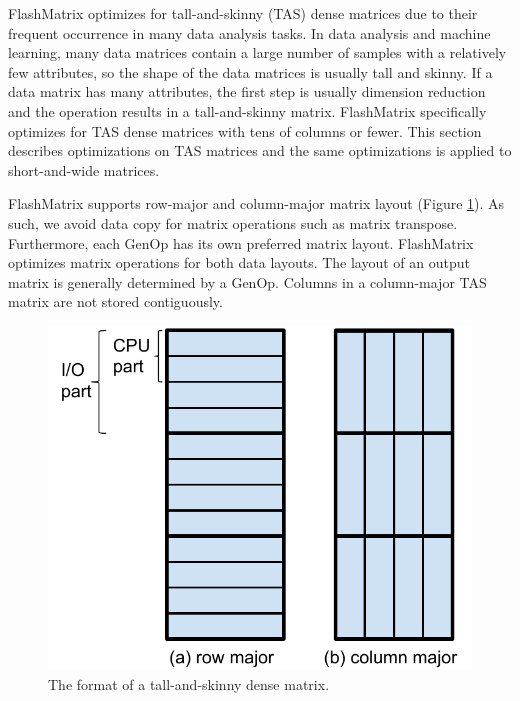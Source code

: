 FlashMatrix optimizes for tall-and-skinny (TAS) dense matrices due to their
frequent occurrence in many data analysis tasks.
In data analysis and machine learning, many data matrices contain a large
number of samples with a relatively few attributes, so the shape
of the data matrices is usually tall and skinny. If a data matrix has many
attributes, the first step is usually dimension reduction \cite{} and
the operation results in a tall-and-skinny matrix. FlashMatrix specifically
optimizes for TAS dense matrices with tens of columns or fewer.
This section describes optimizations on TAS matrices and the same optimizations
is applied to short-and-wide matrices.

FlashMatrix supports row-major and column-major matrix layout (Figure
\ref{fig:tas_mat}). As such,
we avoid data copy for matrix operations such as matrix transpose.
Furthermore, each GenOp has its own preferred matrix layout. FlashMatrix
optimizes matrix operations for both data layouts. The layout of an output
matrix is generally determined by a GenOp. Columns in a column-major TAS matrix
are not stored contiguously.

\begin{figure}
	\centering
	\includegraphics[scale=0.5]{./dense_matrix.pdf}
	\caption{The format of a tall-and-skinny dense matrix.}
	\label{fig:tas_mat}
\end{figure}

